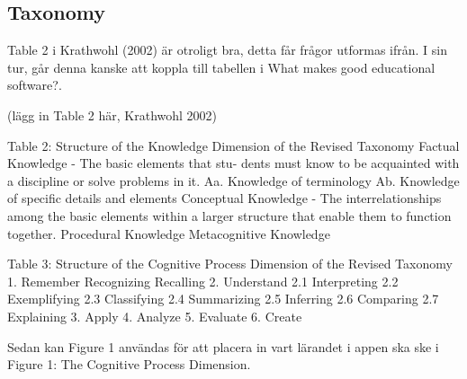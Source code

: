 \subsection{Taxonomy}

Table 2 i Krathwohl (2002) är otroligt bra, detta får frågor utformas ifrån. I sin tur, går denna kanske att koppla till tabellen i What makes good educational software?.

(lägg in Table 2 här, Krathwohl 2002)

Table 2: Structure of the Knowledge Dimension of the Revised Taxonomy
Factual Knowledge - The basic elements that stu- dents must know to be acquainted with a discipline or solve problems in it.
  Aa. Knowledge of terminology
  Ab. Knowledge of specific details and elements
Conceptual Knowledge - The interrelationships among the basic elements within a larger structure that enable them to function together.
Procedural Knowledge
Metacognitive Knowledge

Table 3: Structure of the Cognitive Process Dimension of the Revised Taxonomy
1. Remember
  Recognizing
  Recalling
2. Understand
  2.1 Interpreting
  2.2 Exemplifying
  2.3 Classifying
  2.4 Summarizing
  2.5 Inferring
  2.6 Comparing
  2.7 Explaining
3. Apply
4. Analyze
5. Evaluate
6. Create

Sedan kan Figure 1 användas för att placera in vart lärandet i appen ska ske i Figure 1: The Cognitive Process Dimension.
